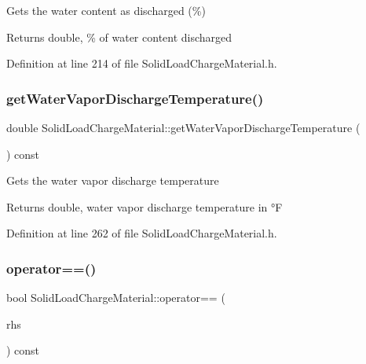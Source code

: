 Gets the water content as discharged (\%) \begin{DoxyReturn}{Returns}
double, \% of water content discharged 
\end{DoxyReturn}


Definition at line 214 of file Solid\+Load\+Charge\+Material.\+h.

\mbox{\label{class_solid_load_charge_material_a267f26d42f8ba2655c09f561fc0f6cb1}} 
\subsubsection{\texorpdfstring{get\+Water\+Vapor\+Discharge\+Temperature()}{getWaterVaporDischargeTemperature()}}
{\footnotesize\ttfamily double Solid\+Load\+Charge\+Material\+::get\+Water\+Vapor\+Discharge\+Temperature (\begin{DoxyParamCaption}{ }\end{DoxyParamCaption}) const\hspace{0.3cm}{\ttfamily [inline]}}

Gets the water vapor discharge temperature \begin{DoxyReturn}{Returns}
double, water vapor discharge temperature in °F 
\end{DoxyReturn}


Definition at line 262 of file Solid\+Load\+Charge\+Material.\+h.

\mbox{\label{class_solid_load_charge_material_aacf2f41ce38067a52fb7d8456a05a699}} 
\subsubsection{\texorpdfstring{operator==()}{operator==()}}
{\footnotesize\ttfamily bool Solid\+Load\+Charge\+Material\+::operator== (\begin{DoxyParamCaption}\item[{const \hyperlink{class_solid_load_charge_material}{Solid\+Load\+Charge\+Material} \&}]{rhs }\end{DoxyParamCaption}) const\hspace{0.3cm}{\ttfamily [inline]}}

